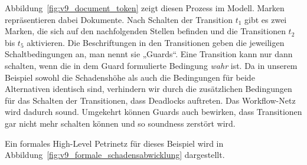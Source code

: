 \vspace{\baselineskip} %

Abbildung~\ref{fig:v9_document_token} zeigt diesen Prozess im Modell. Marken repräsentieren dabei Dokumente. Nach Schalten der Transition $t_1$ gibt es zwei Marken, die sich auf den nachfolgenden Stellen befinden und die Transitionen $t_2$ bis $t_5$ aktivieren. Die Beschriftungen in den Transitionen geben die jeweiligen Schaltbedingungen an, man nennt sie „Guards“. Eine Transition kann nur dann schalten, wenn die in dem Guard formulierte Bedingung \textit{wahr} ist. Da in unserem Beispiel sowohl die Schadenshöhe als auch die Bedingungen für beide Alternativen identisch sind, verhindern wir durch die zusätzlichen Bedingungen für das Schalten der Transitionen, dass Deadlocks auftreten. Das Workflow-Netz wird dadurch sound. Umgekehrt können Guards auch bewirken, dass Transitionen gar nicht mehr schalten können und so soundness zerstört wird.

Ein formales High-Level Petrinetz für dieses Beispiel wird in Abbildung~\ref{fig:v9_formale_schadensabwicklung} dargestellt.

\pagebreak %

\vspace{\baselineskip} %

